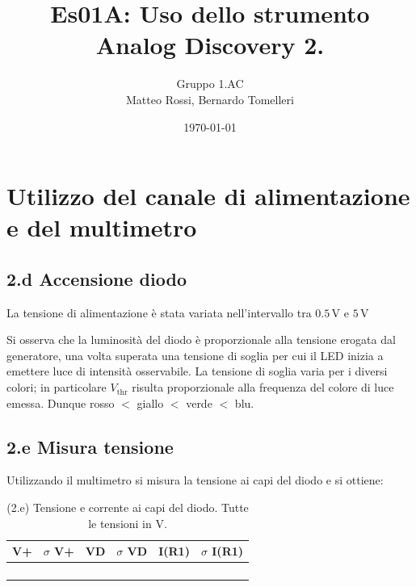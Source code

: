 \documentclass[10pt,a4paper]{article}
\author{Gruppo 1.AC \\ Matteo Rossi, Bernardo Tomelleri}
\title{Es01A: Uso dello strumento Analog Discovery 2.}
\newcommand{\exn}{\phantom{xxx}}
\begin{document}
\date{\today}
\maketitle

\setcounter{section}{1}

\section{Utilizzo del canale di alimentazione e del multimetro}

\subsection*{2.d Accensione diodo}

La tensione di alimentazione \`e stata variata nell'intervallo tra
$0.5\,\mathrm{V}$ e $5\,\mathrm{V}$


Si osserva che la luminosit\`a del diodo è proporzionale alla tensione
erogata dal generatore, una volta superata una tensione di soglia per cui
il LED inizia a emettere luce di intensità osservabile. La tensione di soglia
varia per i diversi colori; in particolare $V_{\mathrm{thr}}$ risulta
proporzionale alla frequenza del colore di luce emessa. Dunque
rosso $<$ giallo $<$ verde $<$ blu.

\subsection*{2.e Misura tensione}
Utilizzando il multimetro si misura la tensione ai capi del diodo e si ottiene:

\begin{table}[h]
\centering
\begin{tabular}{|c|c|c|c|c|c|}
\hline 
V+& $\sigma$ V+  & VD & $\sigma$ VD & I(R1)  & $\sigma$ I(R1) \\
\hline 
\exn & \exn & \exn & \exn & \exn &\exn \\
\exn & \exn & \exn & \exn & \exn &\exn \\
\exn & \exn & \exn & \exn & \exn &\exn \\
\exn & \exn & \exn & \exn & \exn &\exn \\
\hline 
\end{tabular} 
\caption{(2.e) Tensione e corrente ai capi del diodo.
Tutte le tensioni in V.\label{t:par1}}
\end{table}

\end{document}
